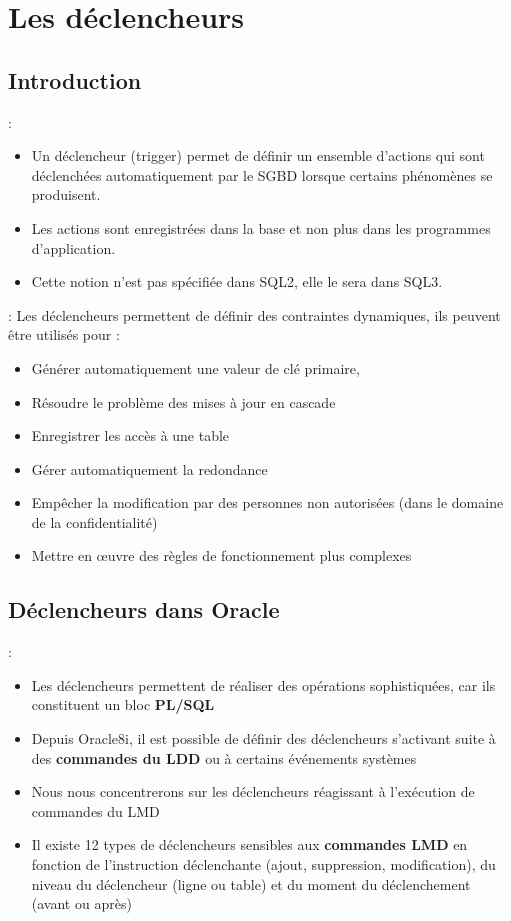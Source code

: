 \documentclass[10pt]{beamer}
\begin{document}
\section{Les déclencheurs}
\subsection{Introduction}
\begin{frame}{\secname : \subsecname}
    \begin{itemize}
        \item Un déclencheur (trigger) permet de définir un ensemble d'actions qui sont déclenchées automatiquement par le SGBD lorsque certains phénomènes se produisent.
        \item Les actions sont enregistrées dans la base et non plus dans les programmes d'application.
        \item Cette notion n'est pas spécifiée dans SQL2, elle le sera dans SQL3.
    \end{itemize}
\end{frame}

\begin{frame}{\secname : \subsecname}
    Les déclencheurs permettent de définir des contraintes dynamiques, ils peuvent être utilisés pour :
    \begin{itemize}
        \item Générer automatiquement une valeur de clé primaire,
        \item Résoudre le problème des mises à jour en cascade
        \item Enregistrer les accès à une table
        \item Gérer automatiquement la redondance
        \item Empêcher la modification par des personnes non autorisées (dans le domaine de la confidentialité)
        \item Mettre en œuvre des règles de fonctionnement plus complexes
    \end{itemize}
\end{frame}
\subsection{Déclencheurs dans Oracle}
\begin{frame}{\secname : \subsecname}
    \begin{itemize}
        \item Les déclencheurs permettent de réaliser des opérations sophistiquées, car ils constituent un bloc \textbf{PL/SQL}
        \item Depuis Oracle8i, il est possible de définir des déclencheurs s'activant suite à des \textbf{commandes du LDD} ou à certains événements systèmes
        \item Nous nous concentrerons sur les déclencheurs réagissant à l'exécution de commandes du LMD
        \item Il existe 12 types de déclencheurs sensibles aux \textbf{commandes LMD} en fonction de l'instruction déclenchante (ajout, suppression, modification), du niveau du déclencheur (ligne ou table) et du moment du déclenchement (avant ou après)
    \end{itemize}
\end{frame}
\end{document}

